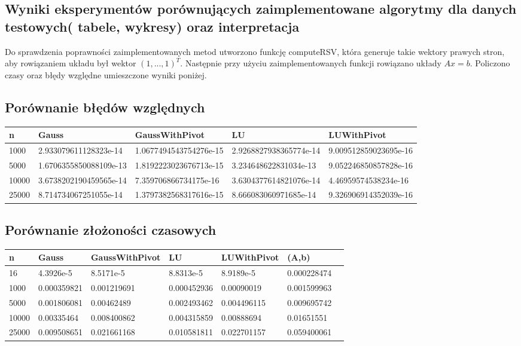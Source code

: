 \documentclass[11pt]{article}
\begin{document}
\begin{flushleft}
\section{Wyniki eksperymentów porównujących zaimplementowane algorytmy dla danych testowych( tabele, wykresy) oraz interpretacja}
Do sprawdzenia poprawności zaimplementowanych metod utworzono funkcję computeRSV, która generuje takie wektory prawych stron, aby rowiązaniem układu był wektor $(1,...,1)^T$. Następnie przy użyciu zaimplementowanych funkcji rowiązano układy $Ax=b$. Policzono czasy oraz błędy względne umieszczone wyniki poniżej.
\subsection{Porównanie błędów względnych}
\begin{tabular}{|l|l|l|l|l|}
 \hline
  n & Gauss & GaussWithPivot & LU & LUWithPivot\\
 \hline

\hline
 1000 & 2.933079611128323e-14  & 1.0677494543754276e-15  & 2.9268827938365774e-14 & 9.009512859023695e-16 \\
\hline
 5000 & 1.6706355850088109e-13  & 1.8192223023676713e-15  & 3.234648622831034e-13 & 9.052246850857828e-16 \\
\hline
 10000 & 3.6738202190459565e-14  & 7.359706866734175e-16  & 3.6304377614821076e-14 & 4.46959574538234e-16 \\
\hline
 25000 & 8.714734067251055e-14  & 1.3797382568317616e-15  & 8.666083060971685e-14 & 9.326906914352039e-16 \\
\hline
\end{tabular}
\subsection{Porównanie złożoności czasowych}
\begin{tabular}{|l|l|l|l|l|l|l|}
 \hline
  n & Gauss & GaussWithPivot & LU & LUWithPivot & (A,b) \\
 \hline
\hline
 16 & 4.3926e-5  &  8.5171e-5 & 8.8313e-5  & 8.9189e-5 & 0.000228474 \\
\hline
 1000 & 0.000359821  &  0.001219691 & 0.000452936  & 0.00090019 & 0.001599963 \\
\hline
 5000 &   0.001806081 & 0.00462489  &  0.002493462 & 0.004496115 & 0.009695742 \\
\hline
 10000 & 0.00335464 & 0.008400862  & 0.004315859 & 0.00888694  & 0.01651551\\
\hline
 25000 &  0.009508651 &  0.021661168  & 0.010581811 & 0.022701157  & 0.059400061\\
\hline
\end{tabular}

\end{flushleft}
\end{document}
